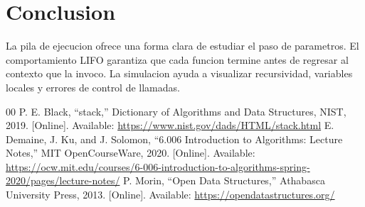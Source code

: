 \documentclass[conference]{IEEEtran}
\begin{document}
\section{Conclusion}
La pila de ejecucion ofrece una forma clara de estudiar el paso de parametros.
El comportamiento LIFO garantiza que cada funcion termine antes de regresar al
contexto que la invoco. La simulacion ayuda a visualizar recursividad,
variables locales y errores de control de llamadas.

\begin{thebibliography}{00}
 P. E. Black, ``stack,'' Dictionary of Algorithms and Data Structures, NIST, 2019. [Online]. Available: \url{https://www.nist.gov/dads/HTML/stack.html}
 E. Demaine, J. Ku, and J. Solomon, ``6.006 Introduction to Algorithms: Lecture Notes,'' MIT OpenCourseWare, 2020. [Online]. Available: \url{https://ocw.mit.edu/courses/6-006-introduction-to-algorithms-spring-2020/pages/lecture-notes/}
 P. Morin, ``Open Data Structures,'' Athabasca University Press, 2013. [Online]. Available: \url{https://opendatastructures.org/}
\end{thebibliography}
\end{document}
